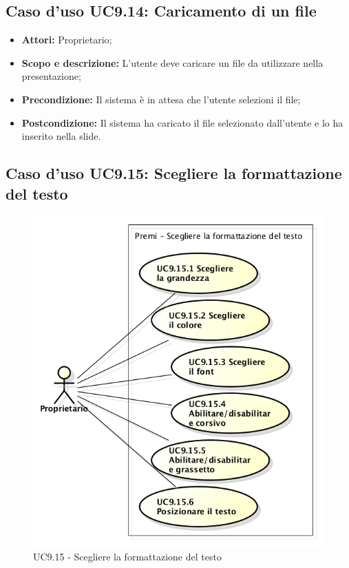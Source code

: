 \subsection{Caso d'uso UC9.14: Caricamento di un file}
\begin{itemize}
	\item \textbf{Attori:} Proprietario;
	\item \textbf{Scopo e descrizione:} L'utente deve caricare un file da utilizzare nella presentazione;
	\item \textbf{Precondizione:} Il sistema è in attesa che l'utente selezioni il file;
	\item \textbf{Postcondizione:} Il sistema ha caricato il file selezionato dall'utente e lo ha inserito nella slide.
\end{itemize}

\newpage
\subsection{Caso d'uso UC9.15: Scegliere la formattazione del testo}
\begin{figure}[h] 
	\centering 
	\includegraphics[scale=0.45] {img/UC9.15.png} 
	\caption{UC9.15 - Scegliere la formattazione del testo}
\end{figure}

